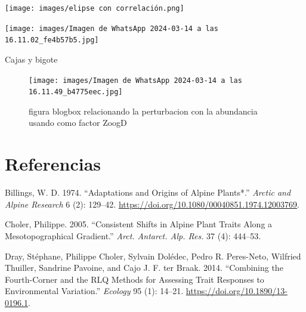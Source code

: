 \documentclass[
  letterpaper,
  DIV=11,
  numbers=noendperiod]{scrartcl}
\newlength{\cslhangindent}
\newlength{\cslentryspacingunit} %
\newenvironment{CSLReferences}[2] %
 {%
  \setlength{\parindent}{0pt}
  \ifodd #1
  \let\oldpar\par
  \def\par{\hangindent=\cslhangindent\oldpar}
  \fi
  \setlength{\parskip}{#2\cslentryspacingunit}
 }%
 {}
\begin{document}
\texttt{[image: images/elipse con correlación.png]}

\texttt{[image: images/Imagen de WhatsApp 2024-03-14 a las 16.11.02\_fe4b57b5.jpg]}

Cajas y bigote

\begin{figure}

{\centering \texttt{[image: images/Imagen de WhatsApp 2024-03-14 a las 16.11.49\_b4775eec.jpg]}

}

\caption{figura blogbox relacionando la perturbacion con la abundancia
usando como factor ZoogD}

\end{figure}

\hypertarget{referencias}{%
\section*{Referencias}\label{referencias}}

\hypertarget{refs}{}
\begin{CSLReferences}{1}{0}
\leavevmode{}%
Billings, W. D. 1974. {``Adaptations and Origins of Alpine Plants*.''}
\emph{Arctic and Alpine Research} 6 (2): 129--42.
\url{https://doi.org/10.1080/00040851.1974.12003769}.

\leavevmode{}%
Choler, Philippe. 2005. {``Consistent Shifts in Alpine Plant Traits
Along a Mesotopographical Gradient.''} \emph{Arct. Antarct. Alp. Res.}
37 (4): 444--53.

\leavevmode{}%
Dray, Stéphane, Philippe Choler, Sylvain Dolédec, Pedro R. Peres-Neto,
Wilfried Thuiller, Sandrine Pavoine, and Cajo J. F. ter Braak. 2014.
{``Combining the Fourth{-}Corner and the RLQ Methods for Assessing Trait
Responses to Environmental Variation.''} \emph{Ecology} 95 (1): 14--21.
\url{https://doi.org/10.1890/13-0196.1}.

\end{CSLReferences}
\end{document}
